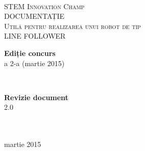 \documentclass[openany, a4, 11pt]{book}
\begin{document}
\begin{titlepage}

\begin{center}
 
\begin{figure}[htb]
\end{figure}
\noindent{\rule{8cm}{0.4pt}}\\[0.3cm]
\textsc{\Large STEM Innovation Champ}\\[5.0cm]

{\Huge DOCUMENTAȚIE}\\[0.4cm]
\textsc{\Large Utilă pentru realizarea unui robot de tip\\ LINE FOLLOWER}\\[5.0cm]

\begin{minipage}{0.5\textwidth}
\begin{flushleft}
\large{\textbf{Ediție concurs}}\\
\large{a 2-a (martie 2015)}
\end{flushleft}
\end{minipage}
~
\begin{minipage}{0.4\textwidth}
\begin{flushright}
\large{\textbf{Revizie document}} \\
2.0\\
\end{flushright}
\end{minipage}\\[3.0cm]

\noindent{\rule{8cm}{0.4pt}}\\[0.3cm] 
{\large martie 2015}\\[1cm] 

\end{center}

\end{titlepage}
\restoregeometry

\thispagestyle{empty}
\section*{}

\restoregeometry



\tableofcontents

\renewcommand\listfigurename{Listă de figuri}
\listoffigures





\end{document}
